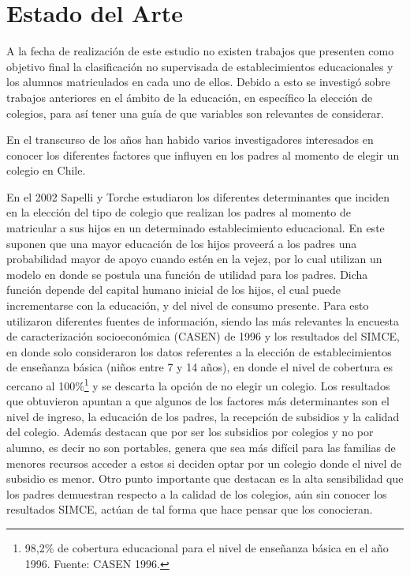 \chapter{Estado del Arte}

A la fecha de realización de este estudio no existen trabajos que presenten como objetivo final la clasificación no supervisada de establecimientos educacionales y los alumnos matriculados en cada uno de ellos. Debido a esto se investigó sobre trabajos anteriores en el ámbito de la educación, en específico la elección de colegios, para así tener una guía de que variables son relevantes de considerar.

En el transcurso de los años han habido varios investigadores interesados en conocer los diferentes factores que influyen en los padres al momento de elegir un colegio en Chile.

En el 2002 Sapelli y Torche \cite{SAPELLI2002} estudiaron los diferentes determinantes que inciden en la elección del tipo de colegio que realizan los padres al momento de matricular a sus hijos en un determinado establecimiento educacional. En este suponen que una mayor educación de los hijos proveerá a los padres  una probabilidad mayor de apoyo cuando estén en la vejez, por lo cual utilizan un modelo en donde se postula una función de utilidad para los padres. Dicha función depende del capital humano inicial de los hijos, el cual puede incrementarse con la educación, y del nivel de consumo presente. Para esto utilizaron diferentes fuentes de información, siendo las más relevantes la encuesta de caracterización socioeconómica (CASEN) de 1996 y los resultados del SIMCE, en donde solo consideraron los datos referentes a la elección de establecimientos de enseñanza básica (niños entre 7 y 14 años), en donde el nivel de cobertura es cercano al 100\%\footnote{98,2\% de cobertura educacional para el nivel de enseñanza básica en el año 1996. Fuente: CASEN 1996.} y se descarta la opción de no elegir un colegio. Los resultados que obtuvieron apuntan a que algunos de los factores más determinantes son el nivel de ingreso, la educación de los padres, la recepción de subsidios y la calidad del colegio. Además destacan que por ser los subsidios por colegios y no por alumno, es decir no son portables, genera que sea más difícil para las familias de menores recursos acceder a estos si deciden optar por un colegio donde el nivel de subsidio es menor. Otro punto importante que destacan es la alta sensibilidad que los padres demuestran respecto a la calidad de los colegios, aún sin conocer los resultados SIMCE, actúan de tal forma que hace pensar que los conocieran.

